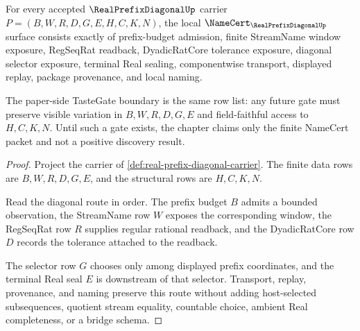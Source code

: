 \begin{theorem}
\label{thm:real-prefix-diagonal-namecert-obligations}
For every accepted $\RealPrefixDiagonalUp$ carrier $P=(B,W,R,D,G,E,H,C,K,N)$, the local $\NameCert_{\RealPrefixDiagonalUp}$ surface consists exactly of prefix-budget admission, finite StreamName window exposure, RegSeqRat readback, DyadicRatCore tolerance exposure, diagonal selector exposure, terminal Real sealing, componentwise transport, displayed replay, package provenance, and local naming.

The paper-side TasteGate boundary is the same row list: any future gate must preserve visible variation in $B,W,R,D,G,E$ and field-faithful access to $H,C,K,N$. Until such a gate exists, the chapter claims only the finite NameCert packet and not a positive discovery result.
\end{theorem}
\begin{proof}
Project the carrier of \autoref{def:real-prefix-diagonal-carrier}. The finite data rows are $B,W,R,D,G,E$, and the structural rows are $H,C,K,N$.

Read the diagonal route in order. The prefix budget $B$ admits a bounded observation, the StreamName row $W$ exposes the corresponding window, the RegSeqRat row $R$ supplies regular rational readback, and the DyadicRatCore row $D$ records the tolerance attached to the readback.

The selector row $G$ chooses only among displayed prefix coordinates, and the terminal Real seal $E$ is downstream of that selector. Transport, replay, provenance, and naming preserve this route without adding host-selected subsequences, quotient stream equality, countable choice, ambient Real completeness, or a bridge schema.
\end{proof}

